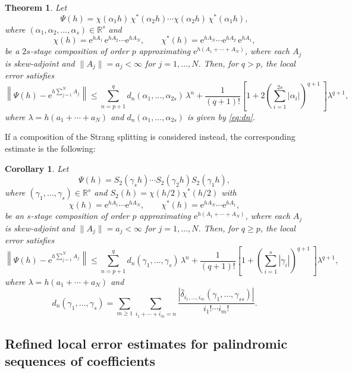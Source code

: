 \documentclass[11pt]{article}
\newcommand{\e}{\ensuremath{\mathrm{e}}}
\newtheorem{theorem}[lemma]{Theorem}
\newtheorem{corollary}[lemma]{Corollary}
\begin{document}
\begin{theorem} \label{th_compo_refined_G}
Let
\[
   \Psi(h) = \chi(\alpha_{1} h) \, \chi^*(\alpha_{2} h) \cdots \chi(\alpha_2 h) \, \chi^*(\alpha_1 h), 
\]
where $(\alpha_1, \alpha_2, \ldots, \alpha_s) \in \mathbb{R}^s$ and
\[
  \chi(h) = \e^{h A_1} \, \e^{h A_2} \cdots \e^{h A_N}, \qquad \chi^*(h) = \e^{h A_N} \cdots \e^{h A_2} \, \e^{h A_1}, 
\]
be a $2s$-stage composition of order $p$ approximating $\e^{h(A_1 + \cdots + A_N)}$, where each $A_j$ is skew-adjoint and $\|A_j\| = a_j  <\infty$ for $j = 1,\ldots, N$. Then, for $q> p$, the local error satisfies
\[
\left\| \Psi(h) - \e^{h \sum_{j=1}^N A_j} \right\| \leq
\sum_{n = p+1}^{q} d_n(\alpha_1,\ldots,\alpha_{2s}) \, \lambda^n +
\frac{1}{(q+1)!} \left[ 1 + 2 \left( \sum_{i=1}^{2s} |\alpha_i| \right)^{q+1} \, \right] \lambda^{q+1},
\]
where $\lambda = h (a_1 + \cdots + a_N)$ and $d_n(\alpha_1,\ldots,\alpha_{2s})$ is given by \eqref{eq:dn}. 
\end{theorem}
If a composition of the Strang splitting is considered instead, the corresponding estimate is the following:

\begin{corollary} \label{th_compo_refined_S}
Let
\[
\Psi(h) = S_2(\gamma_s h) \cdots S_2(\gamma_2 h) S_2(\gamma_1 h),
\]
where $(\gamma_1, \ldots, \gamma_s) \in \mathbb{R}^s$ and $S_2(h) = \chi(h/2)\chi^*(h/2)$ with
\[
\chi(h) = \mathrm{e}^{h A_1} \cdots \mathrm{e}^{h A_N}, \qquad 
\chi^*(h) = \mathrm{e}^{h A_N} \cdots \mathrm{e}^{h A_1},
\]
be an $s$-stage composition of order $p$ approximating $\mathrm{e}^{h(A_1 + \cdots + A_N)}$, where each $A_j$ is skew-adjoint and $\|A_j\| = a_j  <\infty$ for $j = 1,\ldots, N$. Then, for $q \geq p$, the local error satisfies
\[
\left\| \Psi(h) - \mathrm{e}^{h \sum_{j=1}^N A_j} \right\| \leq
\sum_{n = p+1}^{q} d_n(\gamma_1,\ldots,\gamma_s) \, \lambda^n +
\frac{1}{(q+1)!} \left[ 1 + \left( \sum_{i=1}^s |\gamma_i| \right)^{q+1} \, \right] \lambda^{q+1},
\]
where $\lambda = h (a_1 + \cdots + a_N)$ and
\[
  d_n(\gamma_1,\ldots,\gamma_{s}) = \sum_{m \geq 1} \sum_{i_1 + \cdots + i_m = n} \frac{|\hat{\delta}_{i_1,\ldots,i_m}(\gamma_1,\ldots,\gamma_{ss})|}{i_1! \cdots i_m!}.
\]
\end{corollary}


\subsection{Refined local error estimates for palindromic sequences of coefficients}
\end{document}
